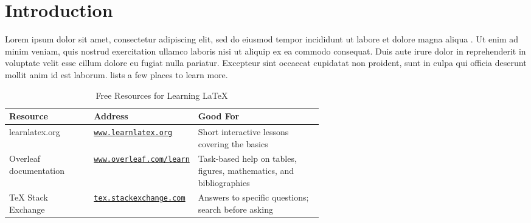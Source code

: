 
\chapter{Introduction}
\label{chap:intro}

Lorem ipsum dolor sit amet, consectetur adipiscing elit, sed do eiusmod tempor incididunt ut labore et dolore magna aliqua \cite{Lamport1994}. Ut enim ad minim veniam, quis nostrud exercitation ullamco laboris nisi ut aliquip ex ea commodo consequat. Duis aute irure dolor in reprehenderit in voluptate velit esse cillum dolore eu fugiat nulla pariatur. Excepteur sint occaecat cupidatat non proident, sunt in culpa qui officia deserunt mollit anim id est laborum.  lists a few places to learn more.

\begin{table}
\centering
\caption{Free Resources for Learning \LaTeX}
\label{table:resources}
\begin{tabularx}{\linewidth}{|>{\raggedright\arraybackslash}p{0.27\linewidth}|>{\raggedright\arraybackslash}p{0.33\linewidth}|>{\raggedright\arraybackslash}X|}
\hline
\textbf{Resource} & \textbf{Address} & \textbf{Good For} \\
\hline
learnlatex.org & \href{https://www.learnlatex.org}{\nolinkurl{www.learnlatex.org}} & Short interactive lessons covering the basics \\
\hline
Overleaf documentation & \href{https://www.overleaf.com/learn}{\nolinkurl{www.overleaf.com/learn}} & Task-based help on tables, figures, mathematics, and bibliographies \\
\hline
TeX Stack Exchange & \href{https://tex.stackexchange.com}{\nolinkurl{tex.stackexchange.com}} & Answers to specific questions; search before asking \\
\hline
\end{tabularx}
\end{table}
